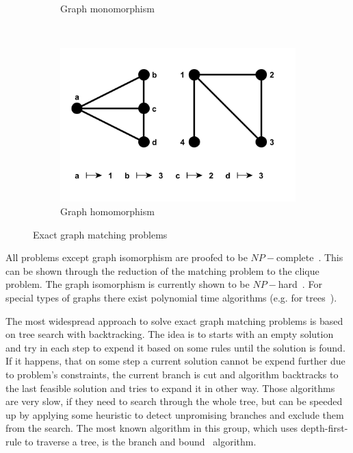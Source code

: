 \begin{figure}[h!]
\begin{subfigure}[b]{0.3\textwidth}
        \caption{Graph monomorphism}
        \label{fig:monomorphism}
    \end{subfigure}
    ~
    \begin{subfigure}[b]{0.3\textwidth}
        \includegraphics[width=\textwidth]{chapter1/fig/homomorphism}
        \caption{Graph homomorphism}
        \label{fig:homomorphism}
    \end{subfigure}
    \caption{Exact graph matching problems}\label{fig:Exact_GM}
\end{figure}

All problems except graph isomorphism are proofed to be $NP-$complete~\cite{Garey_NPComplet}. This can be shown through the reduction of the matching problem to the clique problem. The graph isomorphism is currently shown to be $NP-$hard~\cite{Garey_NPComplet,Schoening_GI}. For special types of graphs there exist polynomial time algorithms (e.g. for %
trees~\cite{Aho_Ullman, Garey_NPComplet}).

The most widespread approach to solve exact graph matching problems is based on tree search with backtracking. The idea is to starts with an empty solution and try in each step to expend it based on some rules until the solution is found. If it happens, that on some step a current solution cannot be expend further due to problem's constraints, the current branch is cut and algorithm backtracks to the last feasible solution and tries to expand it in other way. Those algorithms are very slow, if they need to search through the whole tree, but can be speeded up by applying some heuristic to detect unpromising branches and exclude them from the search. The most known algorithm in this group, which uses depth-first-rule to traverse a tree, is the branch and bound~\cite{Reingold} algorithm.

